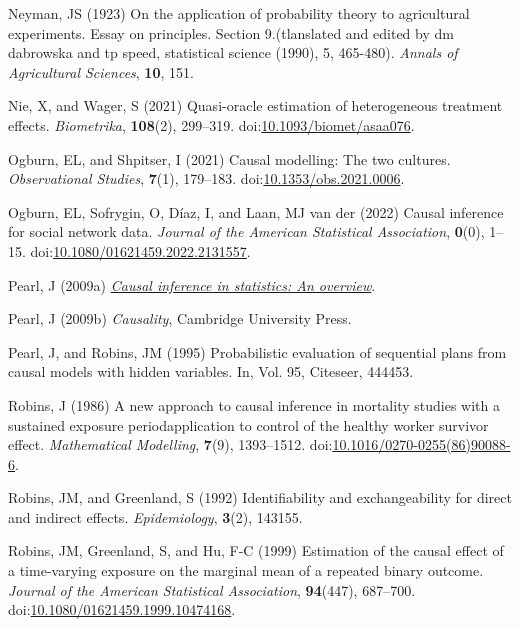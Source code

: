 \documentclass[
  singlecolumn,
  9pt]{article}
\begin{document}
\begin{CSLReferences}
Neyman, JS (1923) On the application of probability theory to
agricultural experiments. Essay on principles. Section 9.(tlanslated and
edited by dm dabrowska and tp speed, statistical science (1990), 5,
465-480). \emph{Annals of Agricultural Sciences}, \textbf{10}, 151.

Nie, X, and Wager, S (2021) Quasi-oracle estimation of heterogeneous
treatment effects. \emph{Biometrika}, \textbf{108}(2), 299--319.
doi:\href{https://doi.org/10.1093/biomet/asaa076}{10.1093/biomet/asaa076}.

Ogburn, EL, and Shpitser, I (2021) Causal modelling: The two cultures.
\emph{Observational Studies}, \textbf{7}(1), 179--183.
doi:\href{https://doi.org/10.1353/obs.2021.0006}{10.1353/obs.2021.0006}.

Ogburn, EL, Sofrygin, O, Díaz, I, and Laan, MJ van der (2022) Causal
inference for social network data. \emph{Journal of the American
Statistical Association}, \textbf{0}(0), 1--15.
doi:\href{https://doi.org/10.1080/01621459.2022.2131557}{10.1080/01621459.2022.2131557}.

Pearl, J (2009a) \emph{\href{https://doi.org/10.1214/09-SS057}{Causal
inference in statistics: An overview}}.

Pearl, J (2009b) \emph{Causality}, Cambridge University Press.

Pearl, J, and Robins, JM (1995) Probabilistic evaluation of sequential
plans from causal models with hidden variables. In, Vol. 95, Citeseer,
444453.

Robins, J (1986) A new approach to causal inference in mortality studies
with a sustained exposure period{\textemdash}application to control of
the healthy worker survivor effect. \emph{Mathematical Modelling},
\textbf{7}(9), 1393--1512.
doi:\href{https://doi.org/10.1016/0270-0255(86)90088-6}{10.1016/0270-0255(86)90088-6}.

Robins, JM, and Greenland, S (1992) Identifiability and exchangeability
for direct and indirect effects. \emph{Epidemiology}, \textbf{3}(2),
143155.

Robins, JM, Greenland, S, and Hu, F-C (1999) Estimation of the causal
effect of a time-varying exposure on the marginal mean of a repeated
binary outcome. \emph{Journal of the American Statistical Association},
\textbf{94}(447), 687--700.
doi:\href{https://doi.org/10.1080/01621459.1999.10474168}{10.1080/01621459.1999.10474168}.


\end{CSLReferences}
\end{document}
